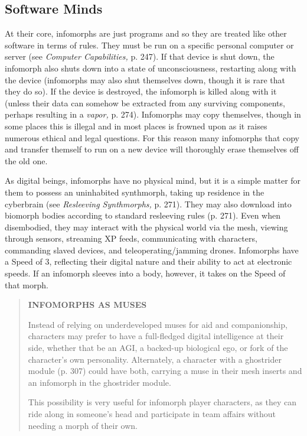 \subsection{Software Minds}

At their core, infomorphs are just programs and so 
they are treated like other software in terms of rules. 
They must be run on a specific personal computer or 
server (see \textit{Computer Capabilities,} p. 247). If that 
device is shut down, the infomorph also shuts down 
into a state of unconsciousness, restarting along with 
the device (infomorphs may also shut themselves 
down, though it is rare that they do so). If the device is 
destroyed, the infomorph is killed along with it (unless 
their data can somehow be extracted from any surviving
components, perhaps resulting in a \textit{vapor,} p. 274).
Infomorphs may copy themselves, though in some 
places this is illegal and in most places is frowned 
upon as it raises numerous ethical and legal questions. 
For this reason many infomorphs that copy and transfer
themself to run on a new device will thoroughly
erase themselves off the old one.

As digital beings, infomorphs have no physical 
mind, but it is a simple matter for them to possess 
an uninhabited synthmorph, taking up residence in 
the cyberbrain (see \textit{Resleeving Synthmorphs,} p. 271). 
They may also download into biomorph bodies according
to standard resleeving rules (p. 271). Even
when disembodied, they may interact with the 
physical world via the mesh, viewing through sensors, 
streaming XP feeds, communicating with characters, 
commanding slaved devices, and teleoperating/jamming
drones.
Infomorphs have a Speed of 3, reflecting their digital
nature and their ability to act at electronic speeds.
If an infomorph sleeves into a body, however, it takes 
on the Speed of that morph.


\begin{quotation}
\textbf{INFOMORPHS AS MUSES}

Instead of relying on underdeveloped muses for
aid and companionship, characters may prefer to
have a full-fledged digital intelligence at their
side, whether that be an AGI, a backed-up biological
ego, or fork of the character’s own personality.
Alternately, a character with a ghostrider
module (p. 307) could have both, carrying a muse
in their mesh inserts and an infomorph in the
ghostrider module.

This possibility is very useful for infomorph
player characters, as they can ride along in someone’s
head and participate in team affairs without
needing a morph of their own.
\end{quotation}

